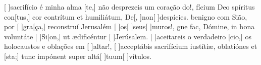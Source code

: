 {    {[ ]{sa}crifício é minha alma [te,] não desprezeis um coração do!},
  {fícium Deo spíritus con[tus,] cor contrítum et humiliátum, De[, ]{non}[ ]{de}{spíci}es.}%
    { benigno com Sião, por [ ]{gra}[ça,] reconstruí Jerusalém [ ]{os}[ ]{seus}[ ]{mu}ros!},
  {gne fac, Dómine, in bona voluntáte [ ]{Si}[\-on,] ut ædificéntur [ ]{Je}{rúsa}lem.}%
    {[ ]{a}ceitareis o verdadeiro [cio,] os holocaustos e oblações em [ ]{al}{tar}!},
  {[ ]{ac}ceptábis sacrifícium iustítiæ, oblatiónes et [\-sta;] tunc impónent super altá[ ]{tu}{um}[ ]{vítu}\-los.}%
    {}
}